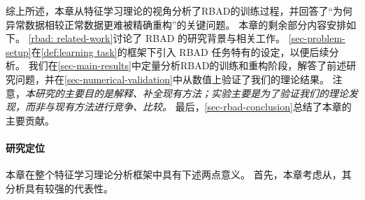 综上所述，本章从特征学习理论的视角分析了RBAD的训练过程，并回答了“为何异常数据相较正常数据更难被精确重构”的关键问题。
本章的剩余部分内容安排如下。
\cref{rbad: related-work}讨论了 RBAD 的研究背景与相关工作。
\cref{sec-problem-setup}在\cref{def:learning task}的框架下引入 RBAD 任务特有的设定，以便后续分析。
我们在\cref{sec-main-results}中定量分析RBAD的训练和重构阶段，解答了前述研究问题，并在\cref{sec-numerical-validation}中从数值上验证了我们的理论结果。
注意，\emph{本研究的主要目的是解释、补全现有方法；实验主要是为了验证我们的理论发现，而非与现有方法进行竞争、比较。}
最后，\cref{sec-rbad-conclusion}总结了本章的主要贡献。

\paragraph{研究定位}
本章在整个特征学习理论分析框架中具有下述两点意义。
首先，本章考虑从，其分析具有较强的代表性。







